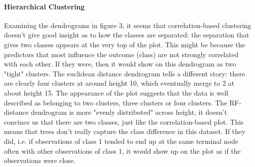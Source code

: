 \documentclass{article}
\begin{document}
\paragraph{Hierarchical Clustering}

Examining the dendrograms in figure 3, it seems that correlation-based clustering doesn't give good insight as to how the classes are separated: the separation that gives two classes appears at the very top of the plot. This might be because the predictors that most influence the outcome (class) are not strongly correlated with each other. If they were, then it would show on this dendrogram as two "tight" clusters. The euclidean distance dendrogram tells a different story: there are clearly four clusters at around height 10, which eventually merge to 2 at about height 15. The appearance of the plot suggests that the data is well described as belonging to two clusters, three clusters or four clusters. The RF-distance dendrogram is more "evenly distributed" across height, it doesn't convince us that there are two classes, just like the correlation-based plot. This means that trees don't really capture the class difference in this dataset. If they did, i.e. if observations of class 1 tended to end up at the same terminal node often with other observations of class 1, it would show up on the plot as if the observations were close.
\end{document}
